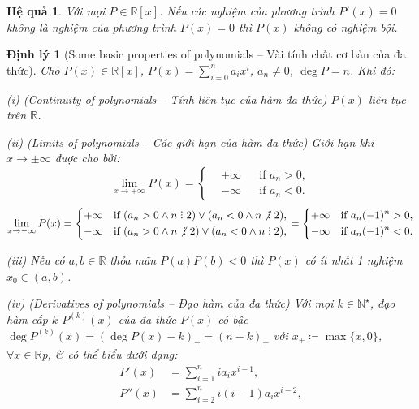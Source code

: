 \documentclass{article}
\newtheorem{dinhly}{Định lý}
\newtheorem{hequa}{Hệ quả}
\DeclareRobustCommand{\divby}{%
	\mathrel{\vbox{\baselineskip.65ex\lineskiplimit0pt\hbox{.}\hbox{.}\hbox{.}}}%
}
\begin{document}
\begin{hequa}
	Với mọi $P\in\mathbb{R}[x]$. Nếu các nghiệm của phương trình $P'(x) = 0$ không là nghiệm của phương trình $P(x) = 0$ thì $P(x)$ không có nghiệm bội.
\end{hequa}

\begin{dinhly}[Some basic properties of polynomials -- Vài tính chất cơ bản của đa thức]
	Cho $P(x)\in\mathbb{R}[x]$, $P(x) = \sum_{i=0}^n a_ix^i$, $a_n\ne0$, $\deg P = n$. Khi đó:
	\item(i) {\rm(Continuity of polynomials -- Tính liên tục của hàm đa thức)} $P(x)$ liên tục trên $\mathbb{R}$.
	\item(ii) {\rm(Limits of polynomials -- Các giới hạn của hàm đa thức)} Giới hạn khi $x\to\pm\infty$ được cho bởi:
	\begin{equation*}
		\lim_{x\to+\infty} P(x) = \left\{\begin{split}
			&+\infty&&\mbox{if } a_n > 0,\\
			&-\infty&&\mbox{if } a_n < 0.
		\end{split}\right.
	\end{equation*}
	\begin{equation*}
		\lim_{x\to-\infty} P(x) = \left\{\begin{split}
			+&\infty&&\mbox{if }(a_n > 0\land n\divby2)\lor(a_n < 0\land n\not{\divby}\ 2),\\
			-&\infty&&\mbox{if }(a_n > 0\land n\not{\divby}\ 2)\lor(a_n < 0\land n\divby2),
		\end{split}\right. = \left\{\begin{split}
			+&\infty&&\mbox{if } a_n(-1)^n > 0,\\
			-&\infty&&\mbox{if } a_n(-1)^n < 0.
		\end{split}\right.
	\end{equation*}
	\item(iii) Nếu có $a,b\in\mathbb{R}$ thỏa mãn $P(a)P(b) < 0$ thì $P(x)$ có ít nhất 1 nghiệm $x_0\in(a,b)$.
	\item(iv) {\rm(Derivatives of polynomials -- Đạo hàm của đa thức)} Với mọi $k\in\mathbb{N}^\star$, đạo hàm cấp $k$ $P^{(k)}(x)$ của đa thức $P(x)$ có bậc $\deg P^{(k)}(x) = (\deg P(x) - k)_+ = (n - k)_+$ với $x_+\coloneqq\max\{x,0\}$, $\forall x\in\mathbb{R}$p, \& có thể biểu dưới dạng:
	\begin{align*}
		P'(x) &= \sum_{i=1}^n ia_ix^{i-1},\\
		P''(x) &= \sum_{i=2}^n i(i - 1)a_ix^{i-2},\\

\end{align*}
\end{dinhly}
\end{document}
